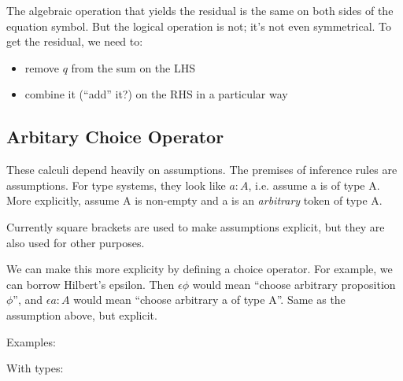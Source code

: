 \documentclass{article}
\begin{document}
The algebraic operation that yields the residual is the same on both
sides of the equation symbol. But the logical operation is not; it's
not even symmetrical.  To get the residual, we need to:

\begin{itemize}
\item remove \(q\) from the sum on the LHS
\item combine it (``add'' it?) on the RHS in a particular way
\end{itemize}

\subsection{Arbitary Choice Operator}

These calculi depend heavily on assumptions. The premises of inference rules are assumptions. For type systems, they look like \(a:A\), i.e. assume a is of type A.  More explicitly, assume A is non-empty and a is an \textit{arbitrary} token of type A.

Currently square brackets are used to make assumptions explicit, but
they are also used for other purposes.

We can make this more explicity by defining a choice operator. For
example, we can borrow Hilbert's epsilon. Then \(\epsilon \phi\) would
mean ``choose arbitrary proposition \(\phi\)'', and \(\epsilon a:A\)
would mean ``choose arbitrary a of type A''. Same as the assumption
above, but explicit.

Examples:


With types:

\end{document}
